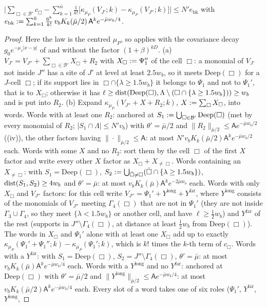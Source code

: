\begin{lemma}[bookkeeping]\label{rot:lem:R1bk}
$\big|\sum_{\Box\in\mathcal B'}c_\Box-\sum_{k=1}^{\bar n}\frac1{k!}\big[\kappa_{\mu_P}(V_{J'};k)-\kappa_{\mu_P}(V_{J''};k)\big]\big|\le N'e_{\mathrm{bk}}$ with $e_{\mathrm{bk}}:=\sum_{k=1}^{\bar n}\frac{6^k}{k!}\,v_bK_k(\bar\mu/2)\,\mathsf A^ke^{-\bar\mu w_b/4}$.
\end{lemma}
\begin{proof}
Here the law is the centred $\mu_P$, so  applies with the covariance decay $g_0e^{-\mu_1|x-y|}$ of  and without the factor $(1+\beta)^{kD}$. (a) $V_{J'}=V_{J''}+\sum_{\Box\in\mathcal B'}X_\Box+R_2$ with $X_\Box:=\Psi_1''$ of the cell $\Box$: a monomial of $V_{J'}$ not inside $J''$ has a site of $J'$ at level at least $2.5w_b$, so it meets $\mathrm{Deep}(\Box)$ for a $J$-cell $\Box$; if its support lies in $\Box\cap\{\lambda\ge1.5w_b\}$ it belongs to $\Psi_1$ and not to $\Psi_1'$, that is to $X_\Box$; otherwise it has $\ell\ge\operatorname{dist}(\mathrm{Deep}(\Box),\Lambda\setminus(\Box\cap\{\lambda\ge1.5w_b\}))\ge w_b$ and is put into $R_2$. (b) Expand $\kappa_{\mu_P}(V_{J''}+X+R_2;k)$, $X:=\sum_\Box X_\Box$, into words. Words with at least one $R_2$:  anchored at $S_1:=\bigcup_{\Box\in\mathcal B'}\mathrm{Deep}(\Box)$ (met by every monomial of $R_2$; $|S_1\cap\Lambda|\le N'v_b$) with $\theta'=\bar\mu/2$ and $\|R_2\|_{\bar\mu/2}\le\mathsf Ae^{-\bar\mu w_b/2}$ ((iv)), the other factors having $\|\cdot\|_{\bar\mu/2}\le\mathsf A$: at most $N'v_bK_k(\bar\mu/2)\mathsf A^ke^{-\bar\mu w_b/2}$ each. Words with some $X$ and no $R_2$: sort them by the cell $\Box$ of the first $X$ factor and write every other $X$ factor as $X_\Box+X_{\ne\Box}$. Words containing an $X_{\ne\Box}$:  with $S_1=\mathrm{Deep}(\Box)$, $S_2:=\bigcup_{\tilde\Box\ne\Box}(\tilde\Box\cap\{\lambda\ge1.5w_b\})$, $\operatorname{dist}(S_1,S_2)\ge4w_b$ and $\theta'=\bar\mu$: at most $v_bK_k(\bar\mu)\mathsf A^ke^{-2\bar\mu w_b}$ each. Words with only $X_\Box$ and $V_{J''}$ factors: for this cell write $V_{J''}=\Psi_1'+Y^{\mathrm{long}}+Y^{\mathrm{far}}$, where $Y^{\mathrm{long}}$ consists of the monomials of $V_{J''}$ meeting $\Gamma_4(\Box)$ that are not in $\Psi_1'$ (they are not inside $\Gamma_3\cup\Gamma_4$, so they meet $\{\lambda<1.5w_b\}$ or another cell, and have $\ell\ge\frac12w_b$) and $Y^{\mathrm{far}}$ of the rest (supports in $J''\setminus\Gamma_4(\Box)$, at distance at least $\frac12w_b$ from $\mathrm{Deep}(\Box)$). The words in $X_\Box$ and $\Psi_1'$ alone with at least one $X_\Box$ add up to exactly $\kappa_{\mu_P}(\Psi_1'+\Psi_1'';k)-\kappa_{\mu_P}(\Psi_1';k)$, which is $k!$ times the $k$-th term of $c_\Box$. Words with a $Y^{\mathrm{far}}$:  with $S_1=\mathrm{Deep}(\Box)$, $S_2=J''\setminus\Gamma_4(\Box)$, $\theta'=\bar\mu$: at most $v_bK_k(\bar\mu)\mathsf A^ke^{-\bar\mu w_b/4}$ each. Words with a $Y^{\mathrm{long}}$ and no $Y^{\mathrm{far}}$: anchored at $\mathrm{Deep}(\Box)$ with $\theta'=\bar\mu/2$ and $\|Y^{\mathrm{long}}\|_{\bar\mu/2}\le\mathsf Ae^{-\bar\mu w_b/4}$: at most $v_bK_k(\bar\mu/2)\mathsf A^ke^{-\bar\mu w_b/4}$ each. Every slot of a word takes one of six roles ($\Psi_1'$, $Y^{\mathrm{far}}$, $Y^{\mathrm{long}}$, 
\end{proof}

